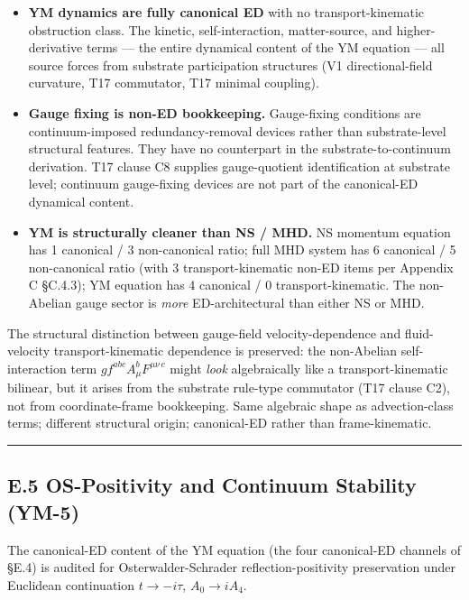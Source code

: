 \documentclass[
]{article}
\providecommand{\tightlist}{%
  \setlength{\itemsep}{0pt}\setlength{\parskip}{0pt}}
\begin{document}
\begin{itemize}
\tightlist
\item
  \textbf{YM dynamics are fully canonical ED} with no
  transport-kinematic obstruction class. The kinetic, self-interaction,
  matter-source, and higher-derivative terms --- the entire dynamical
  content of the YM equation --- all source forces from substrate
  participation structures (V1 directional-field curvature, T17
  commutator, T17 minimal coupling).
\item
  \textbf{Gauge fixing is non-ED bookkeeping.} Gauge-fixing conditions
  are continuum-imposed redundancy-removal devices rather than
  substrate-level structural features. They have no counterpart in the
  substrate-to-continuum derivation. T17 clause C8 supplies
  gauge-quotient identification at substrate level; continuum
  gauge-fixing devices are not part of the canonical-ED dynamical
  content.
\item
  \textbf{YM is structurally cleaner than NS / MHD.} NS momentum
  equation has 1 canonical / 3 non-canonical ratio; full MHD system has
  6 canonical / 5 non-canonical ratio (with 3 transport-kinematic non-ED
  items per Appendix C §C.4.3); YM equation has 4 canonical / 0
  transport-kinematic. The non-Abelian gauge sector is \emph{more}
  ED-architectural than either NS or MHD.
\end{itemize}

The structural distinction between gauge-field velocity-dependence and
fluid-velocity transport-kinematic dependence is preserved: the
non-Abelian self-interaction term \(gf^{abc}A_\mu^b F^{\mu\nu\,c}\)
might \emph{look} algebraically like a transport-kinematic bilinear, but
it arises from the substrate rule-type commutator (T17 clause C2), not
from coordinate-frame bookkeeping. Same algebraic shape as
advection-class terms; different structural origin; canonical-ED rather
than frame-kinematic.

\begin{center}\rule{0.5\linewidth}{0.5pt}\end{center}

\subsection{E.5 OS-Positivity and Continuum Stability
(YM-5)}\label{e.5-os-positivity-and-continuum-stability-ym-5}

The canonical-ED content of the YM equation (the four canonical-ED
channels of §E.4) is audited for Osterwalder-Schrader
reflection-positivity preservation under Euclidean continuation
\(t \to -i\tau\), \(A_0 \to iA_4\).
\end{document}
